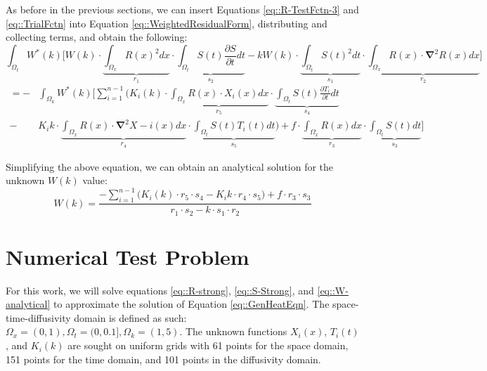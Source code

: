 \documentclass{article}
\def\ds{\displaystyle}
\def\pd{\partial}
\def\grad{\mathbf\nabla}
\begin{document}
As before in the previous sections, we can insert Equations \ref{eq::R-TestFctn-3} and \ref{eq::TrialFctn} into Equation \ref{eq::WeightedResidualForm}, distributing and collecting terms, and obtain the following:
\begin{equation*}
\ds\int_{\Omega_t} W^*(k) \bigg[W(k) \cdot \underbrace{\ds\int_{\Omega_x} R(x)^2 dx}_{r_1} \cdot \underbrace{\ds\int_{\Omega_t} S(t)\frac{\pd S}{\pd t} dt}_{s_2} - kW(k) \cdot \underbrace{\ds\int_{\Omega_t} S(t)^2 dt}_{s_1} \cdot \underbrace{\ds\int_{\Omega_x} R(x)\cdot \grad^2R(x) dx}_{r_2} \bigg]
\end{equation*}\vspace{-15pt}
\begin{align}
=  -& \ds\int_{\Omega_k} W^*(k) \Bigg[\ds\sum_{i=1}^{n-1} \bigg( K_i(k) \cdot \underbrace{\ds\int_{\Omega_x} R(x)\cdot X_i(x) dx}_{r_5} \cdot \underbrace{\ds\int_{\Omega_t} S(t) \frac{\pd T_i}{\pd t} dt}_{s_4} \nonumber\\
- & K_i k \cdot \underbrace{\ds\int_{\Omega_x} R(x)\cdot \grad^2 X-i(x)dx}_{r_4} \cdot \underbrace{\ds\int_{\Omega_t} S(t)T_i(t)dt}_{s_5}\bigg) + f\cdot \underbrace{\ds\int_{\Omega_x} R(x) dx }_{r_3} \cdot \underbrace{\ds\int_{\Omega_t}S(t)dt}_{s_3} \Bigg]
\end{align}

Simplifying the above equation, we can obtain an analytical solution for the unknown $W(k)$ value:
\begin{equation}
\label{eq::W-analytical}
W(k) =  \frac{-\ds\sum_{i=1}^{n-1} \bigg( K_i(k) \cdot r_5 \cdot s_4 -  K_i k \cdot r_4 \cdot s_5\bigg) + f\cdot r_3 \cdot s_3}{r_1 \cdot s_2 - k \cdot s_1 \cdot r_2}
\end{equation}

\section{Numerical Test Problem}
For this work, we will solve equations \ref{eq::R-strong}, \ref{eq::S-Strong}, and \ref{eq::W-analytical} to approximate the solution of Equation \ref{eq::GenHeatEqn}. The space-time-diffusivity domain is defined as such: $\Omega_x = (0,1), \Omega_t = (0,0.1], \Omega_k = (1,5)$. The unknown functions $X_i(x)$, $T_i(t)$, and $K_i(k)$ are sought on uniform grids with 61 points for the space domain, 151 points for the time domain, and 101 points in the diffusivity domain.
\end{document}
